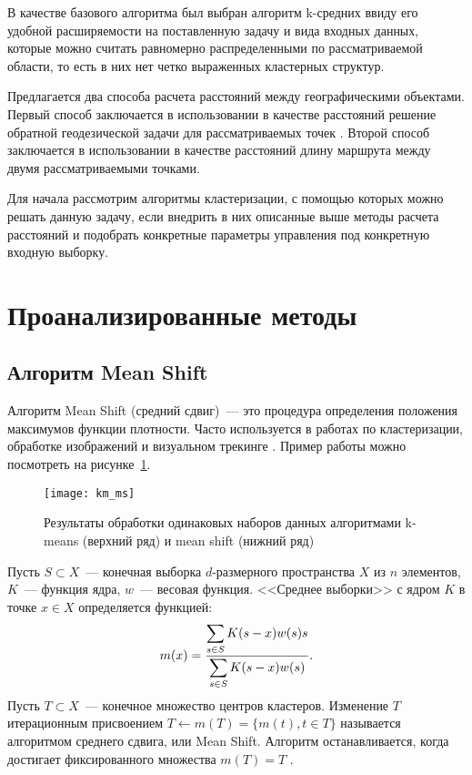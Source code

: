 В качестве базового алгоритма был выбран алгоритм k-средних ввиду его удобной расширяемости на поставленную задачу и вида входных данных, которые можно считать равномерно распределенными по рассматриваемой области, то есть в них нет четко выраженных кластерных структур.

Предлагается два способа расчета расстояний между географическими объектами. Первый способ заключается в использовании в качестве расстояний решение обратной геодезической задачи для рассматриваемых точек \cite{geodesic}. Второй способ заключается в использовании в качестве расстояний длину маршрута между двумя рассматриваемыми точками.

Для начала рассмотрим алгоритмы кластеризации, с помощью которых можно решать данную задачу, если внедрить в них описанные выше методы расчета расстояний и подобрать конкретные параметры управления под конкретную входную выборку.

\section{Проанализированные методы}
\subsection{Алгоритм Mean Shift}
Алгоритм Mean Shift (средний сдвиг)~--- это процедура определения положения максимумов функции плотности. Часто используется в работах по кластеризации, обработке изображений и визуальном трекинге \cite{ms, meanshift}. Пример работы можно посмотреть на рисунке~\ref{pic:km-ms}.

\begin{figure}[h!]
    \centering
    \texttt{[image: km\_ms]}\\[1ex]
    \parbox{.9\textwidth}{\caption{Результаты обработки одинаковых наборов данных алгоритмами k-means (верхний ряд) и mean shift (нижний ряд)} \label{pic:km-ms}}
\end{figure}

Пусть \( S\subset X \)~--- конечная выборка \( d \)-размерного пространства \( X \) из \( n \) элементов, \( K \)~--- функция ядра, \( w \)~--- весовая функция. <<Среднее выборки>> с ядром \( K \) в точке \( x\in X \) определяется функцией:
\begin{equation}
    m(x) = \frac{\displaystyle\sum_{s\in S} K(s - x)w(s)s}{\displaystyle\sum_{s\in S} K(s - x)w(s)}.
    \label{eq:wiki-shift}
\end{equation}
Пусть \( T\subset X \)~--- конечное множество центров кластеров. Изменение \( T \) итерационным присвоением \( T\gets m(T) = \Big\{ m(t), t\in T\Big\} \) называется алгоритмом среднего сдвига, или Mean Shift. Алгоритм останавливается, когда достигает фиксированного множества \( m(T) = T \) \cite{meanshift}.

